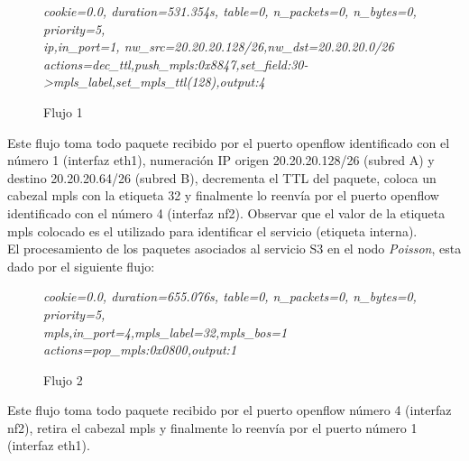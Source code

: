 
\begin{figure}[h]
\textit{cookie=0.0, duration=531.354s, table=0, n\_packets=0, n\_bytes=0, priority=5, \\
ip,in\_port=1, nw\_src=20.20.20.128/26,nw\_dst=20.20.20.0/26 \\
actions=dec\_ttl,push\_mpls:0x8847,set\_field:30->mpls\_label,set\_mpls\_ttl(128),output:4}
\centering
\caption{Flujo 1}
\label{fig:Flujo1}
\end{figure}

Este flujo toma todo paquete recibido por el puerto openflow identificado con el n\'umero 1 (interfaz eth1), numeración IP origen 20.20.20.128/26 (subred A) y destino 20.20.20.64/26 (subred B), decrementa el TTL del paquete, coloca un cabezal mpls con la etiqueta 32 y finalmente lo reenvía por el puerto openflow identificado con el n\'umero 4 (interfaz nf2). Observar que el valor de la etiqueta mpls colocado es el utilizado para identificar el servicio (etiqueta interna). \\


El procesamiento de los paquetes asociados al servicio S3 en el nodo \textit{Poisson}, esta dado por el siguiente flujo:

\begin{figure}[h]
\textit{cookie=0.0, duration=655.076s, table=0, n\_packets=0, n\_bytes=0, priority=5, \\
mpls,in\_port=4,mpls\_label=32,mpls\_bos=1 \\
actions=pop\_mpls:0x0800,output:1 }
\centering
\caption{Flujo 2}
\label{fig:Flujo2}
\end{figure}

Este flujo toma todo paquete recibido por el puerto openflow n\'umero 4 (interfaz nf2), retira el cabezal mpls y finalmente lo reenvía por el puerto n\'umero 1 (interfaz eth1).\\

